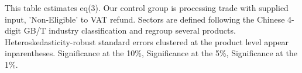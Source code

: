 \documentclass[preview]{standalone}
\begin{document}
\begin{table}[!htbp]
\begin{tablenotes}
This table estimates eq(3). 
Our control group is processing trade with supplied input, 'Non-Eligible' to VAT refund.
Sectors are defined following the Chinese 4-digit GB/T industry
classification and regroup several products.
Heteroskedasticity-robust standard errors
clustered at the product level appear inparentheses.
\sym{*} Significance at the 10\%, \sym{**} Significance at the 5\%, \sym{***} Significance at the 1\%. 
\end{tablenotes}
\end{table}
\end{document}
